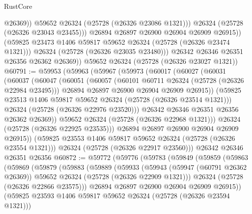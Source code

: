 \begin{lexlean}{RustCore}
\begin{coremodule}
                      @26369))
                  @59652
                  @26324
                  (@25728 (@26326 @23086 @1321)))
                @26324
                (@25728 (@26326 @23043 @23455)))
              @26894
              @26897
              @26900
              @26904
              @26909
              @26915))
          (@59825 @23473 @1406 @59817 @59652 @26324 (@25728 (@26326 @23474 @1321)))
          @26324
          (@25728 (@26326 @23035 @23480)))
        @26342
        @26346
        @26351
        @26356
        @26362
        @26369))
    @59652
    @26324
    (@25728 (@26326 @23027 @1321))
@60791 := @59953
    (@59963
      (@59967
        (@59973
          (@60017
            (@60027
              (@60031
                (@60037
                  (@60047
                    (@60051
                      (@60057
                        (@60101 @60711 @26324 (@25728 (@26326 @22984 @23495)))
                        @26894
                        @26897
                        @26900
                        @26904
                        @26909
                        @26915))
                    (@59825 @23513 @1406 @59817 @59652 @26324 (@25728 (@26326 @23514 @1321)))
                    @26324
                    (@25728 (@26326 @22976 @23520)))
                  @26342
                  @26346
                  @26351
                  @26356
                  @26362
                  @26369))
              @59652
              @26324
              (@25728 (@26326 @22968 @1321)))
            @26324
            (@25728 (@26326 @22925 @23535)))
          @26894
          @26897
          @26900
          @26904
          @26909
          @26915))
      (@59825 @23553 @1406 @59817 @59652 @26324 (@25728 (@26326 @23554 @1321)))
      @26324
      (@25728 (@26326 @22917 @23560)))
    @26342
    @26346
    @26351
    @26356
@60872 := @59772
    (@59776
      (@59783
        (@59849
          (@59859
            (@59863
              (@59869
                (@59879
                  (@59883
                    (@59889
                      (@59933
                        (@59943
                          (@59947 (@60791 @26362 @26369))
                          @59652
                          @26324
                          (@25728 (@26326 @22909 @1321)))
                        @26324
                        (@25728 (@26326 @22866 @23575)))
                      @26894
                      @26897
                      @26900
                      @26904
                      @26909
                      @26915))
                  (@59825 @23593 @1406 @59817 @59652 @26324 (@25728 (@26326 @23594 @1321)))

\end{coremodule}
\end{lexlean}
